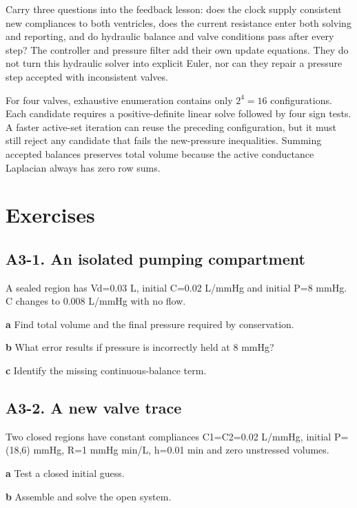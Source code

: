 \documentclass[11pt,letterpaper]{article}
\theoremstyle{definition}\newtheorem{definition}{Definition}\newtheorem{example}{Example}
\numberwithin{equation}{section}
\begin{document}
Carry three questions into the feedback lesson: does the clock supply consistent new compliances to both ventricles, does the current resistance enter both solving and reporting, and do hydraulic balance and valve conditions pass after every step? The controller and pressure filter add their own update equations. They do not turn this hydraulic solver into explicit Euler, nor can they repair a pressure step accepted with inconsistent valves.

For four valves, exhaustive enumeration contains only $2^4=16$ configurations. Each candidate requires a positive-definite linear solve followed by four sign tests. A faster active-set iteration can reuse the preceding configuration, but it must still reject any candidate that fails the new-pressure inequalities. Summing accepted balances preserves total volume because the active conductance Laplacian always has zero row sums.
\bigskip
\section*{Exercises}
\par\noindent\begin{minipage}{\linewidth}
\subsection*{A3-1. An isolated pumping compartment}
A sealed region has Vd=\allowbreak{}0.03 L, initial C=\allowbreak{}0.02 L/mmHg and initial P=\allowbreak{}8 mmHg. C changes to 0.008 L/mmHg with no flow.

\textbf{a} Find total volume and the final pressure required by conservation.

\end{minipage}\par\medskip
\textbf{b} What error results if pressure is incorrectly held at 8 mmHg?

\textbf{c} Identify the missing continuous-balance term.

\par\noindent\begin{minipage}{\linewidth}
\subsection*{A3-2. A new valve trace}
Two closed regions have constant compliances C1=\allowbreak{}C2=\allowbreak{}0.02 L/mmHg, initial P=\allowbreak{}(18,6) mmHg, R=\allowbreak{}1 mmHg min/L, h=\allowbreak{}0.01 min and zero unstressed volumes.

\textbf{a} Test a closed initial guess.

\end{minipage}\par\medskip
\textbf{b} Assemble and solve the open system.
\end{document}
